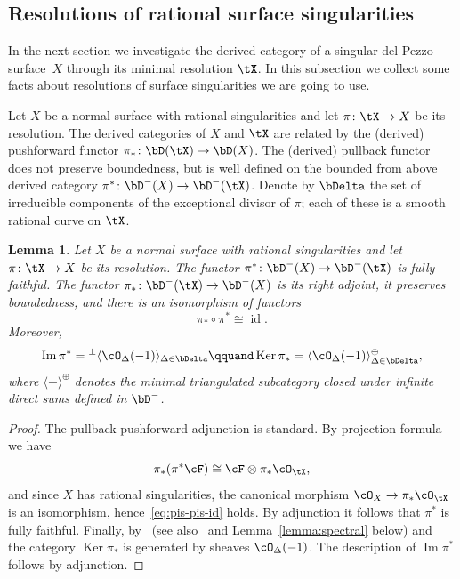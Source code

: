\documentclass[11pt]{amsart}
\DeclareMathOperator{\Ker}{\mathrm{Ker}}
\DeclareMathOperator{\Ima}{\mathrm{Im}}
\DeclareMathOperator{\id}{\mathrm{id}}
\theoremstyle{plain}
\newtheorem{lemma}[theorem]{Lemma}
\theoremstyle{definition}
\theoremstyle{remark}
\begin{document}
\subsection{Resolutions of rational surface singularities}
\label{subsection:resolutions}

In the next section we investigate the derived category of a singular del Pezzo surface~$X$ through its minimal resolution $\tX$.
In this subsection we collect some facts about resolutions of surface singularities we are going to use.

Let $X$ be a normal surface with rational singularities and let $\pi \colon \tX \to X$ be its resolution.
The derived categories of $X$ and $\tX$ are related by the (derived) pushforward functor $\pi_* \colon \bD(\tX) \to \bD(X)$.
The (derived) pullback functor does not preserve boundedness, but is well defined on the bounded from above derived category $\pi^* \colon \bD^-(X) \to \bD^-(\tX)$.
Denote by $\bDelta$ the set of irreducible components of the exceptional divisor of $\pi$;
each of these is a smooth rational curve on $\tX$.

\begin{lemma}
\label{lemma:pi-properties}
Let $X$ be a normal surface with rational singularities and let $\pi \colon \tX \to X$ be its resolution.
The functor $\pi^* \colon \bD^-(X) \to \bD^-(\tX)$ is fully faithful.
The functor $\pi_* \colon \bD^-(\tX) \to \bD^-(X)$ is its right adjoint, 
it preserves boundedness, and there is an isomorphism of functors
\begin{equation}\label{eq:pis-pis-id}
\pi_* \circ \pi^* \cong \id.
\end{equation}
Moreover, 
\begin{equation*}
\Ima \pi^* = {}^\perp\langle \cO_\Delta(-1) \rangle_{\Delta \in \bDelta}
\qquand
\Ker \pi_* = \langle \cO_\Delta(-1) \rangle^\oplus_{\Delta \in \bDelta},
\end{equation*}
where $\langle - \rangle^\oplus$ denotes the minimal triangulated subcategory closed under infinite direct sums defined in $\bD^-$.
\end{lemma}
\begin{proof}
The pullback-pushforward adjunction is standard.
By projection formula we have
\begin{equation*}
\pi_*(\pi^*\cF) \cong \cF \otimes \pi_*\cO_\tX,
\end{equation*}
and since $X$ has rational singularities, the canonical morphism $\cO_X \to \pi_*\cO_\tX$ is an isomorphism, hence~\eqref{eq:pis-pis-id} holds.
By adjunction it follows that $\pi^*$ is fully faithful.
Finally, by~\cite[Lemma~2.1]{bodzenta2015flops} (see also~\cite[Lemma~3.1]{bridgeland} and Lemma~\ref{lemma:spectral} below) and~\cite[Proposition~9.14 and Theorem~9.15]{bodzenta2015flops}
the category $\Ker\pi_*$ is generated by sheaves $\cO_\Delta(-1)$.
The description of $\Ima\pi^*$ follows by adjunction.
\end{proof}
\end{document}
